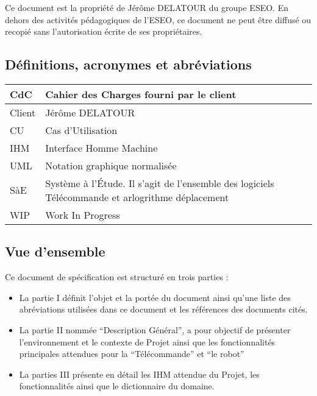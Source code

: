 Ce document est la propriété de Jérôme DELATOUR du groupe ESEO. En dehors des activités pédagogiques de l'ESEO, ce document ne peut être diffusé ou recopié sans l'autorisation écrite de ses propriétaires. 

\subsection{Définitions, acronymes et abréviations}

\begin{tabularx}{\textwidth}{|X X|}
    \hline
    CdC     & Cahier des Charges fourni par le client \\
    \hline
    Client  & Jérôme DELATOUR \\
    \hline
    CU      & Cas d'Utilisation \\
    \hline
    IHM     & Interface Homme Machine \\
    \hline
    UML     & Notation graphique normalisée \\
    \hline
    SàE     & Système à l'Étude. Il s'agit de l'ensemble des logiciels Télécommande et arlogrithme déplacement \\
    \hline
    WIP     & Work In Progress \\
    \hline

\end{tabularx}

\subsection{Vue d'ensemble}

Ce document de spécification est structuré en trois parties : 

\begin{itemize}
    \item La partie I définit l'objet et la portée du document ainsi qu'une liste des abréviations utilisées dans ce document et les références des documents cités. 
    \item La partie II nommée “Description Général”, a pour objectif de présenter l'environnement et le contexte de Projet ainsi que les fonctionnalités principales attendues pour la “Télécommande” et “le robot” 
    \item La parties III présente en détail les IHM attendue du Projet, les fonctionnalités ainsi que le dictionnaire du domaine. 
\end{itemize}